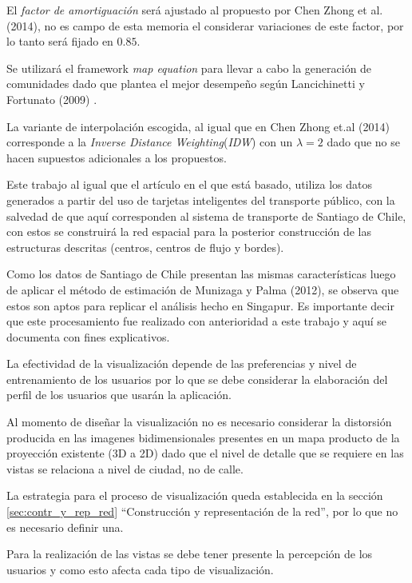 \documentclass[12pt]{article}
\begin{document}
	El \textit{factor de amortiguación} será ajustado al propuesto por Chen Zhong et al. (2014)\cite{Estructura_urbana}, no es campo de esta memoria el considerar variaciones de este factor, por lo tanto será fijado en $0.85$.

	Se utilizará el framework \textit{map equation}	 para llevar a cabo la generación de comunidades dado que plantea el mejor desempeño según Lancichinetti y Fortunato (2009) \cite{Comparar_generador_comunidad}.
	
La variante de interpolación escogida, al igual que en Chen Zhong et.al (2014) corresponde a la \textit{Inverse Distance Weighting}(\textit{IDW}) con un $\lambda=2$ dado que no se hacen supuestos adicionales a los propuestos.
	
	
    Este trabajo al igual que el artículo en el que está basado, utiliza los datos generados a partir del uso de tarjetas inteligentes del transporte público, con la salvedad de que aquí corresponden al sistema de transporte de Santiago de Chile, con estos se construirá  la red espacial para la posterior construcción de las estructuras descritas (centros, centros de flujo y bordes).
	
	Como los datos de Santiago de Chile presentan las mismas características luego de aplicar el método de estimación de Munizaga y Palma (2012), se observa que estos son aptos para replicar el análisis hecho en Singapur. Es importante decir que este procesamiento fue realizado con anterioridad a este trabajo y aquí se documenta con fines explicativos.

La efectividad de la visualización depende de las preferencias  y nivel de entrenamiento de los usuarios por lo que se debe considerar la elaboración del perfil de los usuarios que usarán la aplicación. 

Al momento de diseñar la visualización no es necesario considerar la distorsión producida en las imagenes bidimensionales presentes en un mapa producto de la proyección existente (3D a 2D) dado que el nivel de detalle que se requiere en las vistas se relaciona a nivel de ciudad, no de calle. 

La estrategia para el proceso de visualización queda establecida en la sección \ref{sec:contr_y_rep_red} ``Construcción y representación de la red'', por lo que no es necesario definir una.

	Para la realización de las vistas se debe tener presente la percepción de los usuarios y como esto afecta cada tipo de visualización.
	
\end{document}
